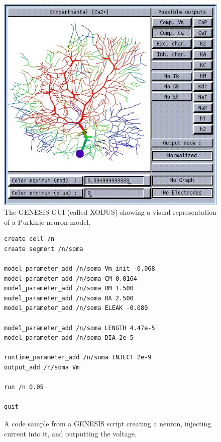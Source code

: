 \begin{figure}
\begin{center}
\includegraphics[height=\textheight,width=5in,keepaspectratio]{figures/genesis_gui.jpg}
\caption[The GENESIS GUI \cite{brette2007simulation}]{The GENESIS GUI (called XODUS) showing a visual representation of a Purkinje neuron model\cite{brette2007simulation}.\label{fig:genesis_gui}}
\end{center}
\end{figure}

\begin{figure}
\begin{center}
\begin{lstlisting}
create cell /n  
create segment /n/soma  
 
model_parameter_add /n/soma Vm_init -0.068  
model_parameter_add /n/soma CM 0.0164  
model_parameter_add /n/soma RM 1.500  
model_parameter_add /n/soma RA 2.500  
model_parameter_add /n/soma ELEAK -0.080  
 
model_parameter_add /n/soma LENGTH 4.47e-5  
model_parameter_add /n/soma DIA 2e-5  
 
runtime_parameter_add /n/soma INJECT 2e-9  
output_add /n/soma Vm  
 
run /n 0.05  
 
quit
\end{lstlisting}
\caption[GENESIS Script Example \cite{bower1995book}]{A code sample from a GENESIS script creating a neuron, injecting current into it, and outputting the voltage\cite{bower1995book}.\label{fig:gscript_example}}
\end{center}
\end{figure}

